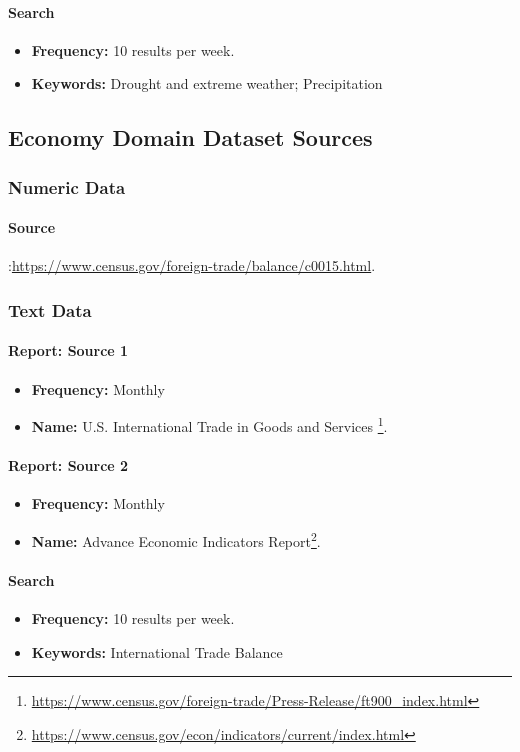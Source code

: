 \paragraph{Search}
\begin{itemize}
    \item \textbf{Frequency:} 10 results per week.
    \item \textbf{Keywords:} Drought and extreme weather; Precipitation
\end{itemize}
\subsection{Economy  Domain Dataset Sources}


\subsubsection{Numeric Data}
\paragraph{Source}:\url{https://www.census.gov/foreign-trade/balance/c0015.html}.

\subsubsection{Text Data}
\paragraph{Report: Source 1}
\begin{itemize}
    \item \textbf{Frequency:} Monthly
    \item \textbf{Name:} U.S. International Trade in Goods and Services \footnote{\url{https://www.census.gov/foreign-trade/Press-Release/ft900_index.html}}.
\end{itemize}
\paragraph{Report: Source 2}
\begin{itemize}
    \item \textbf{Frequency:} Monthly
    \item \textbf{Name:} Advance Economic Indicators Report\footnote{\url{https://www.census.gov/econ/indicators/current/index.html}}.
\end{itemize}
\paragraph{Search}
\begin{itemize}
    \item \textbf{Frequency:} 10 results per week.
    \item \textbf{Keywords:} International Trade Balance
\end{itemize}
